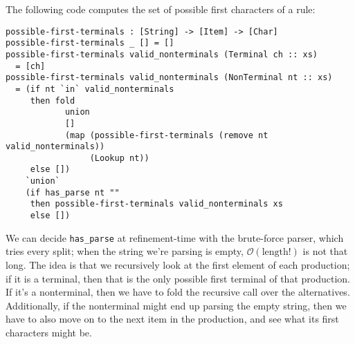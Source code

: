   The following code computes the set of possible first characters of a rule:
\begin{verbatim}
possible-first-terminals : [String] -> [Item] -> [Char]
possible-first-terminals _ [] = []
possible-first-terminals valid_nonterminals (Terminal ch :: xs)
  = [ch]
possible-first-terminals valid_nonterminals (NonTerminal nt :: xs)
  = (if nt `in` valid_nonterminals
     then fold
            union
            []
            (map (possible-first-terminals (remove nt valid_nonterminals))
                 (Lookup nt))
     else [])
    `union`
    (if has_parse nt ""
     then possible-first-terminals valid_nonterminals xs
     else [])
\end{verbatim}
   We can decide \verb|has_parse| at refinement-time with the brute-force parser, which tries every split; when the string we're parsing is empty, $\mathcal O(\text{length}!)$ is not that long.  The idea is that we recursively look at the first element of each production; if it is a terminal, then that is the only possible first terminal of that production.  If it's a nonterminal, then we have to fold the recursive call over the alternatives.  Additionally, if the nonterminal might end up parsing the empty string, then we have to also move on to the next item in the production, and see what its first characters might be.
   
